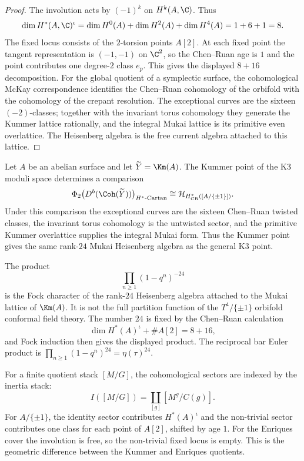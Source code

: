 \begin{proof}
The involution acts by \((-1)^k\) on \(H^k(A,\C)\).  Thus
\[
\dim H^*(A,\C)^\iota
=
\dim H^0(A)+\dim H^2(A)+\dim H^4(A)
=
1+6+1=8.
\]
The fixed locus consists of the \(2\)-torsion points \(A[2]\).  At each
fixed point the tangent representation is \((-1,-1)\) on \(\C^2\), so
the Chen--Ruan age is \(1\) and the point contributes one degree-\(2\)
class \(e_p\).  This gives the displayed \(8+16\) decomposition.  For
the global quotient of a symplectic surface, the cohomological McKay
correspondence identifies the Chen--Ruan cohomology of the orbifold
with the cohomology of the crepant resolution.  The exceptional curves
are the sixteen \((-2)\)-classes; together with the invariant torus
cohomology they generate the Kummer lattice rationally, and the integral
Mukai lattice is its primitive even overlattice.  The Heisenberg algebra
is the free current algebra attached to this lattice.
\end{proof}

\begin{conjecture}
\label{conj:kummer-route}
\ClaimStatusConjectured
Let \(A\) be an abelian surface and let \(\widetilde Y=\Km(A)\).  The
Kummer point of the K3 moduli space determines a comparison
\[
 \Phi_2\bigl(D^b(\Coh(\widetilde Y))\bigr)_{H^*\textup{-}\mathrm{Cartan}}
 \cong
 \mathcal H_{H^*_{\mathrm{CR}}([A/\{\pm1\}])}.
\]
Under this comparison the exceptional curves are the sixteen
Chen--Ruan twisted classes, the invariant torus cohomology is the
untwisted sector, and the primitive Kummer overlattice supplies the
integral Mukai form.  Thus the Kummer point gives the same
rank-\(24\) Mukai Heisenberg algebra as the general K3 point.
\end{conjecture}

\begin{remark}
\label{rem:kummer-resolution-character}
The product
\[
 \prod_{n\geq 1}(1-q^n)^{-24}
\]
is the Fock character of the rank-\(24\) Heisenberg algebra attached to
the Mukai lattice of \(\Km(A)\).  It is not the full partition function
of the \(T^4/\{\pm1\}\) orbifold conformal field theory.  The number
\(24\) is fixed by the Chen--Ruan calculation
\[
 \dim H^*(A)^\iota+\#A[2]=8+16,
\]
and Fock induction then gives the displayed product.  The reciprocal
bar Euler product is \(\prod_{n\geq1}(1-q^n)^{24}=\eta(\tau)^{24}\).
\end{remark}

\begin{remark}
\label{rem:kummer-equivariant-fh}
For a finite quotient stack \([M/G]\), the cohomological sectors are
indexed by the inertia stack:
\[
 I([M/G])=\coprod_{[g]}[M^g/C(g)].
\]
For \(A/\{\pm1\}\), the identity sector contributes
\(H^*(A)^\iota\) and the non-trivial sector contributes one class for
each point of \(A[2]\), shifted by age \(1\).  For the Enriques cover
the involution is free, so the non-trivial fixed locus is empty.  This
is the geometric difference between the Kummer and Enriques quotients.
\end{remark}

